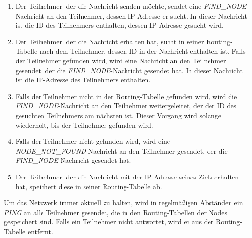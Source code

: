 \begin{enumerate}
    \item Der Teilnehmer, der die Nachricht senden möchte, sendet eine \textit{FIND\_NODE}-Nachricht an den Teilnehmer, dessen IP-Adresse er sucht. In dieser Nachricht ist die ID des Teilnehmers enthalten, dessen IP-Adresse gesucht wird.
    \item Der Teilnehmer, der die Nachricht erhalten hat, sucht in seiner Routing-Tabelle nach dem Teilnehmer, dessen ID in der Nachricht enthalten ist. Falls der Teilnehmer gefunden wird, wird eine Nachricht an den Teilnehmer gesendet, der die \textit{FIND\_NODE}-Nachricht gesendet hat. In dieser Nachricht ist die IP-Adresse des Teilnehmers enthalten.
    \item Falls der Teilnehmer nicht in der Routing-Tabelle gefunden wird, wird die \\
    \textit{FIND\_NODE}-Nachricht an den Teilnehmer weitergeleitet, der der ID des gesuchten Teilnehmers am nächsten ist. Dieser Vorgang wird solange wiederholt, bis der Teilnehmer gefunden wird.
    \item Falls der Teilnehmer nicht gefunden wird, wird eine \\ \textit{NODE\_NOT\_FOUND}-Nachricht an den Teilnehmer gesendet, der die \\ \textit{FIND\_NODE}-Nachricht gesendet hat.
    \item Der Teilnehmer, der die Nachricht mit der IP-Adresse seines Ziels erhalten hat, speichert diese in seiner Routing-Tabelle ab.
\end{enumerate}

\noindent Um das Netzwerk immer aktuell zu halten, wird in regelmäßigen Abständen ein \textit{PING} an alle Teilnehmer gesendet, die in den Routing-Tabellen der Nodes gespeichert sind. Falls ein Teilnehmer nicht antwortet, wird er aus der Routing-Tabelle entfernt.

